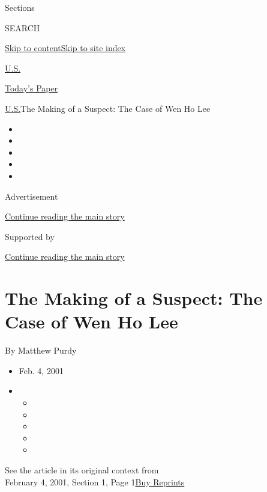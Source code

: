Sections

SEARCH

\protect\hyperlink{site-content}{Skip to
content}\protect\hyperlink{site-index}{Skip to site index}

\href{https://www.nytimes3xbfgragh.onion/section/us}{U.S.}

\href{https://myaccount.nytimes3xbfgragh.onion/auth/login?response_type=cookie\&client_id=vi}{}

\href{https://www.nytimes3xbfgragh.onion/section/todayspaper}{Today's
Paper}

\href{/section/us}{U.S.}\textbar{}The Making of a Suspect: The Case of
Wen Ho Lee

\begin{itemize}
\item
\item
\item
\item
\item
\end{itemize}

Advertisement

\protect\hyperlink{after-top}{Continue reading the main story}

Supported by

\protect\hyperlink{after-sponsor}{Continue reading the main story}

\hypertarget{the-making-of-a-suspect-the-case-of-wen-ho-lee}{%
\section{The Making of a Suspect: The Case of Wen Ho
Lee}\label{the-making-of-a-suspect-the-case-of-wen-ho-lee}}

By Matthew Purdy

\begin{itemize}
\item
  Feb. 4, 2001
\item
  \begin{itemize}
  \item
  \item
  \item
  \item
  \item
  \end{itemize}
\end{itemize}

See the article in its original context from\\
February 4, 2001, Section 1, Page
1\href{https://store.nytimes3xbfgragh.onion/collections/new-york-times-page-reprints?utm_source=nytimes\&utm_medium=article-page\&utm_campaign=reprints}{Buy
Reprints}

